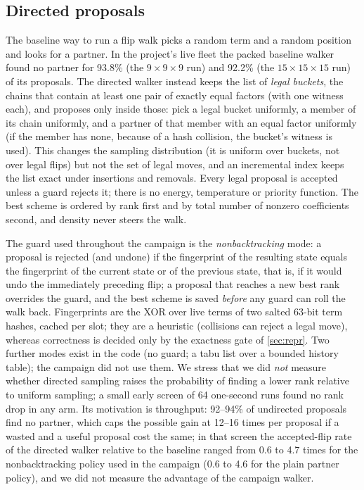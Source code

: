 \subsection{Directed proposals}
The baseline way to run a flip walk picks a random term and a random position and looks for a partner. In the project's live fleet the packed
baseline walker found no partner for 93.8\% (the $9\times9\times9$ run) and 92.2\% (the $15\times15\times15$ run) of its proposals.
The directed walker instead keeps the list of \emph{legal buckets}, the chains that contain at least one pair of exactly equal factors (with one witness
each), and proposes only inside those: pick a legal bucket uniformly, a member of its chain uniformly, and a partner of that member with an equal factor
uniformly (if the member has none, because of a hash collision, the bucket's witness is used). This changes the sampling distribution (it is uniform over buckets, not over legal flips) but not the set of legal moves, and an
incremental index keeps the list exact under insertions and removals. Every legal proposal is accepted unless a guard rejects it; there is no energy,
temperature or priority function. The best scheme is ordered by rank first and by total number of nonzero coefficients second, and density never steers the walk.

The guard used throughout the campaign is the \emph{nonbacktracking} mode: a proposal is rejected (and undone) if the fingerprint of the resulting
state equals the fingerprint of the current state or of the previous state, that is, if it would undo the immediately preceding flip; a proposal that
reaches a new best rank overrides the guard, and the best scheme is saved \emph{before} any guard can roll the walk back.
Fingerprints are the XOR over live terms of two salted 63-bit term hashes, cached per slot; they are a heuristic (collisions can
reject a legal move), whereas correctness is decided only by the exactness gate of \cref{sec:repr}.
Two further modes exist in the code (no guard; a tabu list over a bounded history table); the campaign did not use them.
We stress that we did \emph{not} measure whether directed sampling raises the probability of finding a lower rank
relative to uniform sampling; a small early screen of 64 one-second runs found no rank drop in any arm. Its motivation is throughput: 92--94\% of undirected proposals find no partner, which caps the possible gain at 12--16 times per proposal if a wasted and a useful proposal cost the same; in that screen the accepted-flip rate of the directed walker relative to the baseline ranged from 0.6 to 4.7 times for the nonbacktracking policy used in the campaign (0.6 to 4.6 for the plain partner policy), and we did not measure the advantage of the campaign walker.

